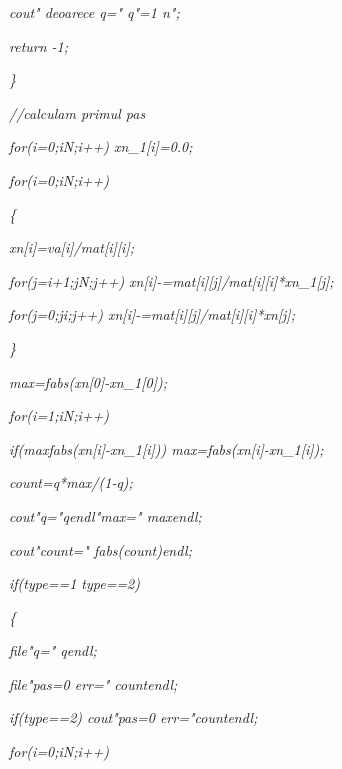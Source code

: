 \documentclass[a4paper,twoside]{book}
\begin{document}
\textit{\qquad \qquad cout\TEXTsymbol{<}\TEXTsymbol{<}" deoarece q="%
\TEXTsymbol{<}\TEXTsymbol{<}q\TEXTsymbol{<}\TEXTsymbol{<}"\TEXTsymbol{>}=1%
\TEXTsymbol{\backslash}n";}

\textit{\qquad \qquad return -1;}

\textit{\qquad \}}

\textit{\qquad //calculam primul pas}

\textit{\qquad for(i=0;i\TEXTsymbol{<}N;i++) xn\_1[i]=0.0;}

\textit{\qquad for(i=0;i\TEXTsymbol{<}N;i++)}

\textit{\qquad \{}

\textit{\qquad \qquad xn[i]=va[i]/mat[i][i];}

\textit{\qquad \qquad for(j=i+1;j\TEXTsymbol{<}N;j++)
xn[i]-=mat[i][j]/mat[i][i]*xn\_1[j];}

\textit{\qquad \qquad for(j=0;j\TEXTsymbol{<}i;j++)
xn[i]-=mat[i][j]/mat[i][i]*xn[j];}

\textit{\qquad \}}

\textit{\qquad max=fabs(xn[0]-xn\_1[0]);}

\textit{\qquad for(i=1;i\TEXTsymbol{<}N;i++)}

\textit{\qquad \qquad if(max\TEXTsymbol{<}fabs(xn[i]-xn\_1[i]))
max=fabs(xn[i]-xn\_1[i]);}

\textit{\qquad count=q*max/(1-q);}

\textit{\qquad cout\TEXTsymbol{<}\TEXTsymbol{<}"q="\TEXTsymbol{<}\TEXTsymbol{%
<}q\TEXTsymbol{<}\TEXTsymbol{<}endl\TEXTsymbol{<}\TEXTsymbol{<}"max="%
\TEXTsymbol{<}\TEXTsymbol{<}max\TEXTsymbol{<}\TEXTsymbol{<}endl;}

\textit{\qquad cout\TEXTsymbol{<}\TEXTsymbol{<}"count="\TEXTsymbol{<}%
\TEXTsymbol{<}fabs(count)\TEXTsymbol{<}\TEXTsymbol{<}endl;}

\textit{\qquad if(type==1 \TEXTsymbol{\vert}\TEXTsymbol{\vert} type==2)}

\textit{\qquad \{}

\textit{\qquad \qquad file\TEXTsymbol{<}\TEXTsymbol{<}"q="\TEXTsymbol{<}%
\TEXTsymbol{<}q\TEXTsymbol{<}\TEXTsymbol{<}endl;}

\textit{\qquad \qquad file\TEXTsymbol{<}\TEXTsymbol{<}"pas=0 err="%
\TEXTsymbol{<}\TEXTsymbol{<}count\TEXTsymbol{<}\TEXTsymbol{<}endl;}

\textit{\qquad \qquad if(type==2) cout\TEXTsymbol{<}\TEXTsymbol{<}"pas=0
err="\TEXTsymbol{<}\TEXTsymbol{<}count\TEXTsymbol{<}\TEXTsymbol{<}endl;}

\textit{\qquad \qquad for(i=0;i\TEXTsymbol{<}N;i++)}
\end{document}
